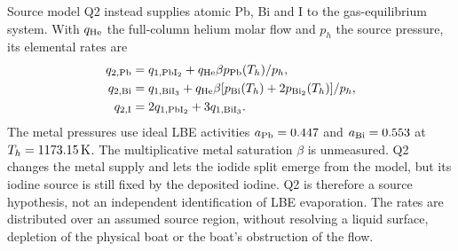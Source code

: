 Source model Q2 instead supplies atomic Pb, Bi and I to the
gas-equilibrium system. With $q_{\rm He}$ the full-column helium molar
flow and $p_h$ the source pressure, its elemental rates are
\begin{align}
 q_{2,\rm Pb}&=q_{1,\rm PbI_2}
             +q_{\rm He}\beta p_{\rm Pb}(T_h)/p_h,\\
 q_{2,\rm Bi}&=q_{1,\rm BiI_3}
             +q_{\rm He}\beta[p_{\rm Bi}(T_h)+2p_{\rm Bi_2}(T_h)]/p_h,\\
 q_{2,\rm I}&=2q_{1,\rm PbI_2}+3q_{1,\rm BiI_3}.
 \label{eq:q2}
\end{align}
The metal pressures use ideal LBE activities $a_{\rm Pb}=0.447$ and
$a_{\rm Bi}=0.553$ at $T_h=1173.15\,\mathrm{K}$. The multiplicative
metal saturation $\beta$ is unmeasured. Q2 changes the metal supply and
lets the iodide split emerge from the model, but its iodine source is
still fixed by the deposited iodine. Q2 is therefore a source
hypothesis, not an independent identification of LBE evaporation. The
rates are distributed over an assumed source region, without resolving
a liquid surface, depletion of the physical boat or the boat's
obstruction of the flow.
